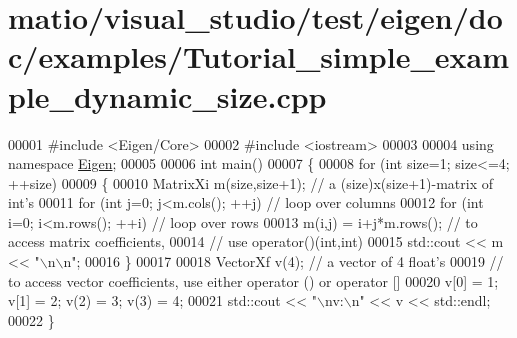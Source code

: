 \hypertarget{matio_2visual__studio_2test_2eigen_2doc_2examples_2_tutorial__simple__example__dynamic__size_8cpp_source}{}\section{matio/visual\+\_\+studio/test/eigen/doc/examples/\+Tutorial\+\_\+simple\+\_\+example\+\_\+dynamic\+\_\+size.cpp}
\label{matio_2visual__studio_2test_2eigen_2doc_2examples_2_tutorial__simple__example__dynamic__size_8cpp_source}

\begin{DoxyCode}
00001 \textcolor{preprocessor}{#include <Eigen/Core>}
00002 \textcolor{preprocessor}{#include <iostream>}
00003 
00004 \textcolor{keyword}{using namespace }\hyperlink{namespace_eigen}{Eigen};
00005 
00006 \textcolor{keywordtype}{int} main()
00007 \{
00008   \textcolor{keywordflow}{for} (\textcolor{keywordtype}{int} size=1; size<=4; ++size)
00009   \{
00010     MatrixXi m(size,size+1);         \textcolor{comment}{// a (size)x(size+1)-matrix of int's}
00011     \textcolor{keywordflow}{for} (\textcolor{keywordtype}{int} j=0; j<m.cols(); ++j)   \textcolor{comment}{// loop over columns}
00012       \textcolor{keywordflow}{for} (\textcolor{keywordtype}{int} i=0; i<m.rows(); ++i) \textcolor{comment}{// loop over rows}
00013         m(i,j) = i+j*m.rows();       \textcolor{comment}{// to access matrix coefficients,}
00014                                      \textcolor{comment}{// use operator()(int,int)}
00015     std::cout << m << \textcolor{stringliteral}{"\(\backslash\)n\(\backslash\)n"};
00016   \}
00017 
00018   VectorXf v(4); \textcolor{comment}{// a vector of 4 float's}
00019   \textcolor{comment}{// to access vector coefficients, use either operator () or operator []}
00020   v[0] = 1; v[1] = 2; v(2) = 3; v(3) = 4;
00021   std::cout << \textcolor{stringliteral}{"\(\backslash\)nv:\(\backslash\)n"} << v << std::endl;
00022 \}
\end{DoxyCode}
